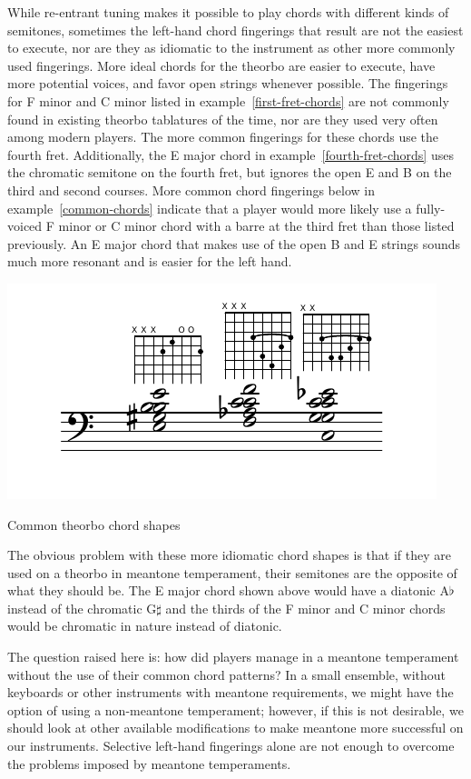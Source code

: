 While re-entrant tuning makes it possible to play chords with different kinds of
semitones, sometimes the left-hand chord fingerings that result are not the easiest to
execute, nor are they as idiomatic to the instrument as other more commonly used
fingerings. More ideal chords for the theorbo are easier to execute, have more potential
voices, and favor open strings whenever possible. The fingerings for F
minor and C minor listed in example~\ref{first-fret-chords} are not commonly found in
existing theorbo tablatures of the time, nor are they used very often among modern
players. The more common fingerings for these chords use the fourth fret.
Additionally, the E major chord in example~\ref{fourth-fret-chords} uses the chromatic
semitone on the fourth fret, but ignores the open E and B on the third and second
courses. More common chord fingerings below in example~\ref{common-chords} indicate that
a player would more likely use a fully-voiced F minor or C minor chord with a barre at
the third fret than those listed previously. An E major chord that makes use of the
open B and E strings sounds much more resonant and is easier for the left hand.
\begin{example}[h]
\centering
\includegraphics{examples/common-chords.pdf}
\caption{Common theorbo chord shapes}
\label{common-chords}
\end{example}
The obvious problem with these more idiomatic chord shapes is that if they are used on
a theorbo in meantone temperament, their semitones are the opposite of what they should be.
The E major chord shown above would have a diatonic A$\flat$ instead of the chromatic
G$\sharp$ and the thirds of the F minor and C minor chords would be chromatic in nature
instead of diatonic.

The question raised here is: how did players manage in a meantone temperament
without the use of their common chord patterns? In a small ensemble, without
keyboards or other instruments with meantone requirements, we might have the
option of using a non-meantone temperament; however, if this is not desirable,
we should look at other available modifications to make meantone more successful
on our instruments. Selective left-hand fingerings alone are not enough to overcome
the problems imposed by meantone temperaments.

